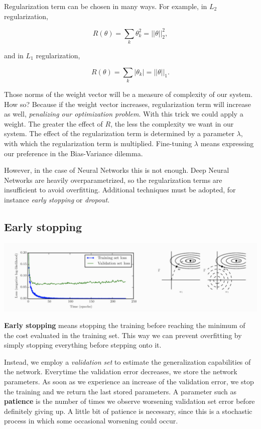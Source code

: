 \documentclass[10pt]{report}
\begin{document}
Regularization term can be chosen in many ways. For example, in \(L_2\)
regularization,

\[R(\theta) = \sum_{k} \theta^2_k = ||\theta||_ 2^2,\]

and in \(L_1\) regularization,

\[R(\theta) = \sum_{k} |\theta_k| = ||\theta||_ 1.\]

Those norms of the weight vector will be a measure of complexity of our
system. How so? Because if the weight vector increases, regularization
term will increase as well, \emph{penalizing our optimization problem}. With
this trick we could apply a weight. The greater the effect of \(R\), the
less the complexity we want in our system. The effect of the
regularization term is determined by a parameter \(\lambda\), with which
the regularization term is multiplied. Fine-tuning \(\lambda\) means
expressing our preference in the Bias-Variance dilemma.

However, in the case of Neural Networks this is not enough. Deep Neural
Networks are heavily overparametrized, so the regularization terms are
insufficient to avoid overfitting. Additional techniques must be
adopted, for instance \emph{early stopping} or \emph{dropout}.

\subsection{Early stopping}
\label{early-stopping}
\begin{center}
\includegraphics[width=.9\linewidth]{./pics/cnn/early-stopping.jpg}
\end{center}

\textbf{Early stopping} means stopping the training before reaching the minimum
of the cost evaluated in the training set. This way we can prevent
overfitting by simply stopping everything before stepping onto it.

Instead, we employ a \emph{validation set} to estimate the generalization
capabilities of the network. Everytime the validation error decreases,
we store the network parameters. As soon as we experience an increase of
the validation error, we stop the training and we return the last stored
parameters. A parameter such as \textbf{patience} is the number of times we
observe worsening validation set error before definitely giving up. A
little bit of patience is necessary, since this is a stochastic process
in which some occasional worsening could occur.
\end{document}
